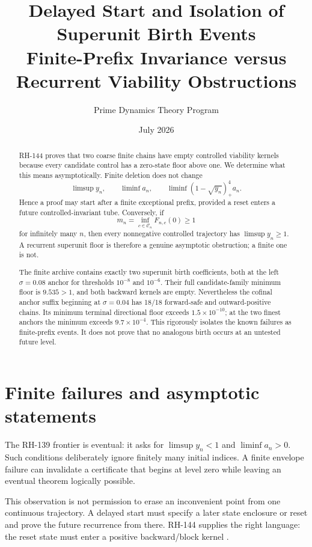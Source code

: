 \documentclass[12pt]{article}
\title{Delayed Start and Isolation of Superunit Birth Events\\\large Finite-Prefix Invariance versus Recurrent Viability Obstructions}
\author{Prime Dynamics Theory Program}
\date{July 2026}
\begin{document}
\maketitle

\begin{abstract}
RH-144 proves that two coarse finite chains have empty controlled viability
kernels because every candidate control has a zero-state floor above one.
We determine what this means asymptotically.  Finite deletion does not change
\[
 \limsup y_n,
 \qquad \liminf a_n,
 \qquad
 \liminf (1-\sqrt{y_n})_+^4a_n.
\]
Hence a proof may start after a finite exceptional prefix, provided a reset
enters a future controlled-invariant tube.  Conversely, if
\[
 m_n=\inf_{c\in\mathcal C_n}F_{n,c}(0)\geq1
\]
for infinitely many $n$, then every nonnegative controlled trajectory has
$\limsup y_n\geq1$.  A recurrent superunit floor is therefore a genuine
asymptotic obstruction; a finite one is not.

The finite archive contains exactly two superunit birth coefficients, both
at the left $\sigma=0.08$ anchor for thresholds $10^{-8}$ and $10^{-6}$.
Their full candidate-family minimum floor is $9.535>1$, and both backward
kernels are empty.  Nevertheless the cofinal anchor suffix beginning at
$\sigma=0.04$ has 18/18 forward-safe and outward-positive chains.  Its
minimum terminal directional floor exceeds $1.5\times10^{-10}$; at the two
finest anchors the minimum exceeds $9.7\times10^{-4}$.  This rigorously
isolates the known failures as finite-prefix events.  It does not prove that
no analogous birth occurs at an untested future level.
\end{abstract}

\section{Finite failures and asymptotic statements}
The RH-139 frontier is eventual: it asks for $\limsup y_n<1$ and
$\liminf a_n>0$.  Such conditions deliberately ignore finitely many initial
indices.  A finite envelope failure can invalidate a certificate that begins
at level zero while leaving an eventual theorem logically possible.

This observation is not permission to erase an inconvenient point from one
continuous trajectory.  A delayed start must specify a later state enclosure
or reset and prove the future recurrence from there.  RH-144 supplies the
right language: the reset state must enter a positive backward/block kernel
\citep{Aubin1991}.
\end{document}

